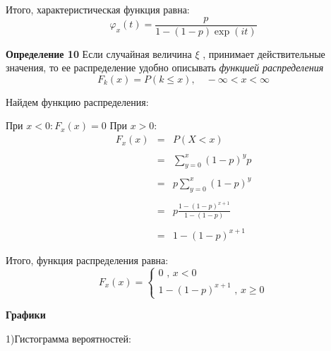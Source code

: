 \documentclass[a4paper,12pt, oneside]{book}
\begin{document}
{Итого, характеристическая функция равна:
$$
\varphi_x(t) = \frac{p}{1-(1-p)\exp(it)}
$$


\normalsize{\textbf{Определение 10} Если случайная  величина $\xi$ , принимает действительные значения, то ее распределение удобно описывать  \textit{ функцией распределения }
$$
F_k(x) = P(k \le x), \quad -\infty < x < \infty
$$

\vspace{\baselineskip}
Найдем функцию распределения:

При $x < 0 : F_x(x) = 0$
При  $x > 0: $\\
$$
\begin{array}{rcl}
F_x(x) &=& P(X < x)\\
\\
&=&\sum\limits_{y=0}^x (1 - p)^y p\\
\\
&=&p \sum\limits_{y=0}^x (1 - p)^y\\
\\
&=&p \frac{1 - (1 - p)^{x + 1}}{1 - (1 - p)}\\
\\
&=& 1 - (1 - p)^{x + 1}
\end{array}
$$

Итого, функция распределения равна:
\begin{equation*}
F_x(x) = 
\begin{cases}
0 \text{	,    $x < 0$}\\
1 - (1 - p)^{x + 1} \text{		,      $x \ge 0$}
\end{cases}
\end{equation*}


\vspace{5mm}
\large{\textbf{{Графики}}}
\vspace{5mm}
	
1)Гистограмма вероятностей:

\begin{minipage}[h]{0.55\linewidth}
\end{minipage}
\\
\vspace{\baselineskip}\\

}}
\end{document}
